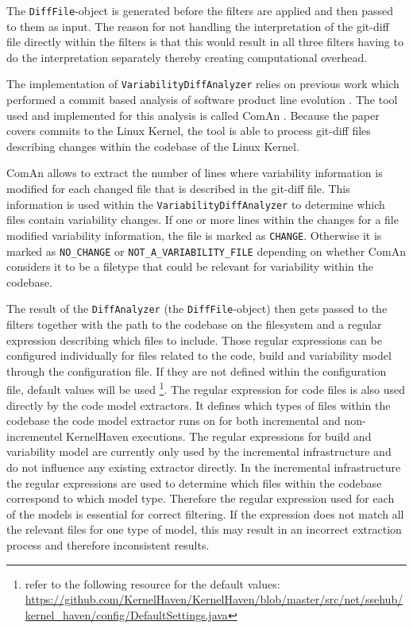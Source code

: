 \documentclass[a4paper]{article}
\begin{document}
The \texttt{DiffFile}-object is generated before the filters are applied and then passed to them as input. The reason for not handling the interpretation of the git-diff file directly within the filters is that this would result in all three filters having to do the interpretation separately thereby creating computational overhead.

The implementation of \texttt{Variability\-Diff\-Analyzer} relies on previous work which performed a commit based analysis of software product line evolution \cite{ComAn}. The tool used and implemented for this analysis  is called ComAn \cite{coman-tool}. Because the paper covers commits to the Linux Kernel, the tool is able to process git-diff files describing changes within the codebase of the Linux Kernel. 

ComAn allows to extract the number of lines where variability information is modified for each changed file that is described in the git-diff file. This information is used within the \texttt{Variability\-Diff\-Analyzer} to determine which files contain variability changes. If one or more lines within the changes for a file modified variability information, the file is marked as \texttt{CHANGE}. Otherwise it is marked as \texttt{NO\_CHANGE} or \texttt{NOT\_A\_VARIABILITY\_FILE} depending on whether ComAn considers it to be a filetype that could be relevant for variability within the codebase. 

The result of the \texttt{DiffAnalyzer} (the \texttt{DiffFile}-object) then gets passed to the filters together with the path to the codebase on the filesystem and a regular expression describing which files to include. Those regular expressions can be configured individually for files related to the code, build and variability model through the configuration file. If they are not defined within the configuration file, default values will be used \footnote{refer to the following resource  for the default values: \url{https://github.com/KernelHaven/KernelHaven/blob/master/src/net/ssehub/kernel_haven/config/DefaultSettings.java}}. The regular expression for code files is also used directly by the code model extractors. It defines which types of files within the codebase the code model extractor runs on for both incremental and non-incrementel KernelHaven executions. The regular expressions for build and variability model are currently only used by the incremental infrastructure and do not influence any existing extractor directly. In the incremental infrastructure the regular expressions are used to determine which files within the codebase correspond to which model type. Therefore the regular expression used for each of the models is essential for correct filtering. If the expression does not match all the relevant files for one type of model, this may result in an incorrect extraction process and therefore inconsistent results.
\end{document}

